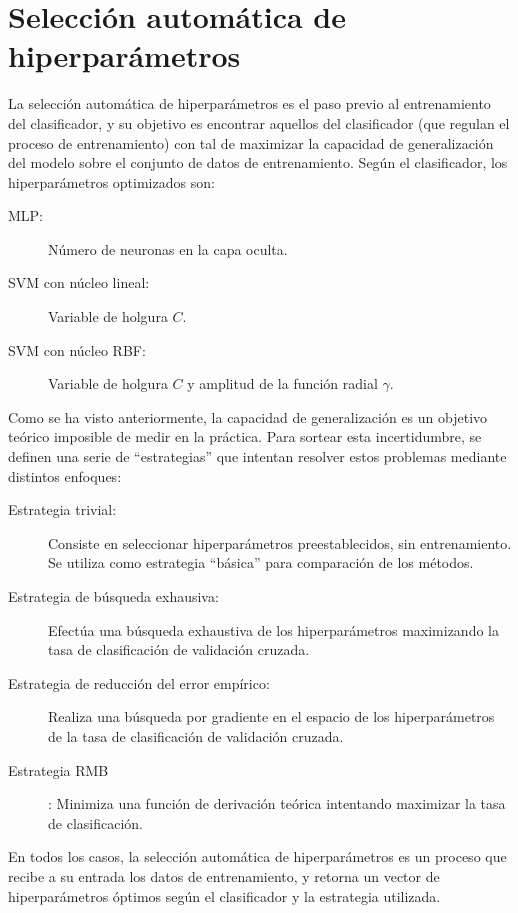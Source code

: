 %
%
%
\section{Selección automática de hiperparámetros}
%
La selección automática de hiperparámetros es el paso previo al
entrenamiento del clasificador, y su objetivo es encontrar aquellos
 del clasificador (que regulan el proceso de entrenamiento)
con tal de maximizar la capacidad de generalización del modelo sobre
el conjunto de datos de entrenamiento.  Según el clasificador, los
hiperparámetros optimizados son:
%
\begin{description}
\item[MLP:] Número de neuronas en la capa oculta.
\item[SVM con núcleo lineal:] Variable de holgura $C$.
\item[SVM con núcleo RBF:] Variable de holgura $C$ y amplitud de la
  función radial $\gamma$.
\end{description}

Como se ha visto anteriormente, la capacidad de generalización es un
objetivo teórico imposible de medir en la práctica. Para sortear esta
incertidumbre, se definen una serie de ``estrategias'' que intentan
resolver estos problemas mediante distintos enfoques:
%
\begin{description}
\item[Estrategia trivial:] Consiste en seleccionar hiperparámetros
  preestablecidos, sin entrenamiento. Se utiliza como estrategia
  ``básica'' para comparación de los métodos.
\item[Estrategia de búsqueda exhausiva:] Efectúa una búsqueda
  exhaustiva de los hiperparámetros maximizando la tasa de
  clasificación de validación cruzada.
\item[Estrategia de reducción del error empírico:] Realiza una
  búsqueda por gradiente en el espacio de los hiperparámetros de la
  tasa de clasificación de validación cruzada.
\item[Estrategia RMB]: Minimiza una función de derivación teórica
  intentando maximizar la tasa de clasificación.
\end{description}
%
En todos los casos, la selección automática de hiperparámetros es un
proceso que recibe a su entrada los datos de entrenamiento, y retorna
un vector de hiperparámetros óptimos según el clasificador y la
estrategia utilizada.
